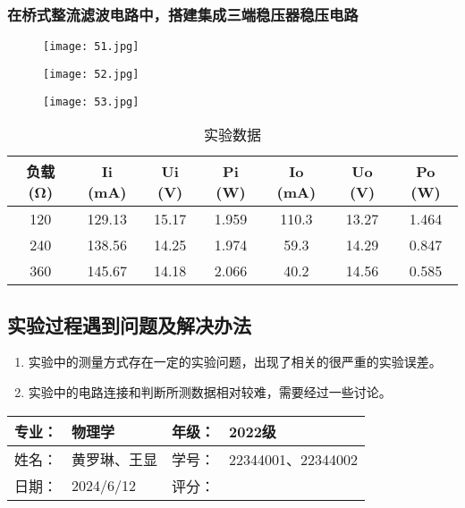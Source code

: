 \documentclass[dvipsnames, svgnames,a4paper,11pt]{article}
\begin{document}
\subsubsection{在桥式整流滤波电路中，搭建集成三端稳压器稳压电路}
\begin{figure}[H]
	\begin{minipage}[b]{0.3\linewidth}
	  \centering
	  \texttt{[image: 51.jpg]}
	  \caption{}
	\end{minipage}
	\hfill
	\begin{minipage}[b]{0.3\linewidth}
	  \centering
	  \texttt{[image: 52.jpg]}
	  \caption{}
	\end{minipage}
	\hfill
	\begin{minipage}[b]{0.3\linewidth}
	  \centering
	  \texttt{[image: 53.jpg]}
	  \caption{}
	\end{minipage}
\end{figure}
\begin{table}[H]
    \centering
    \caption{实验数据}
    \begin{tabular}{|c|c|c|c|c|c|c|}
        \hline
        负载 (Ω) & Ii (mA) & Ui (V) & Pi (W) & Io (mA) & Uo (V) & Po (W) \\
        \hline
        120 & 129.13 & 15.17 & 1.959 & 110.3 & 13.27 & 1.464 \\
        \hline
        240 & 138.56 & 14.25 & 1.974 & 59.3 & 14.29 & 0.847 \\
        \hline
        360 & 145.67 & 14.18 & 2.066 & 40.2 & 14.56 & 0.585 \\
        \hline
    \end{tabular}
\end{table}
	
	\subsection{实验过程遇到问题及解决办法}
	\begin{enumerate}
		\item 实验中的测量方式存在一定的实验问题，出现了相关的很严重的实验误差。
		\item 实验中的电路连接和判断所测数据相对较难，需要经过一些讨论。
	\end{enumerate}
	
	
	
	\clearpage
	
	\begin{table}
		\renewcommand\arraystretch{1.7}
		\begin{tabularx}{\textwidth}{|X|X|X|X|}
			\hline
			专业：& 物理学 &年级：& 2022级\\
			\hline
			姓名： &黄罗琳、王显  & 学号：&22344001、22344002 \\
			\hline
			日期：& 2024/6/12 & 评分： &\\
			\hline
		\end{tabularx}
	\end{table}
	
\end{document}

